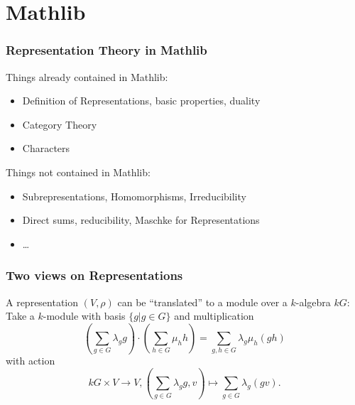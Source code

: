 \documentclass{beamer}
\begin{document}

\section{Mathlib}
\begin{frame}
\frametitle{Representation Theory in Mathlib}
Things already contained in Mathlib:
\begin{itemize}
\item Definition of Representations, basic properties, duality
\item Category Theory
\item Characters
\end{itemize}
\pause
Things not contained in Mathlib:
\begin{itemize}
\item Subrepresentations, Homomorphisms, Irreducibility
\item Direct sums, reducibility, Maschke for Representations
\item \ldots
\end{itemize}
\end{frame}


\begin{frame}
\frametitle{Two views on Representations}
A representation \((V, \rho)\) can be \enquote{translated} to a module over a \(k\)-algebra \(kG\):\\
\pause
Take a \(k\)-module with basis \(\{g\vert g\in G\}\) and multiplication
\begin{equation*}
\left(\sum_{g\in G}\lambda_g g\right)\cdot \left(\sum_{h\in G}\mu_h h\right) = \sum_{g,h\in G} \lambda_g\mu_h (gh)
\end{equation*}
\pause
with action
\begin{equation*}
kG\times V\to V, \left(\sum_{g\in G}\lambda_gg, v\right) \mapsto \sum_{g\in G}\lambda_g(gv).
\end{equation*}
\end{frame}

\end{document}
